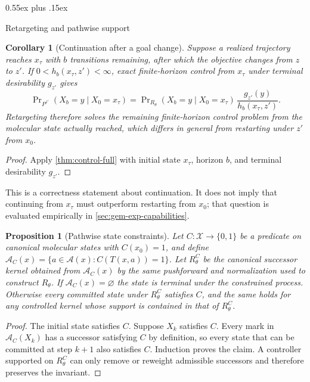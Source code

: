 \documentclass{article}
\makeatletter
\newtheorem{proposition}[theorem]{Proposition}
\newtheorem{corollary}[theorem]{Corollary}
\theoremstyle{definition}
\theoremstyle{remark}
\def\subsection{\@startsection{subsection}{2}{\z@}{-1.2ex plus -0.4ex minus -.2ex}%
  {0.55ex plus .15ex}{\normalsize\sc\raggedright}}
\newcommand{\X}{\mathcal{X}}
\newcommand{\A}{\mathcal{A}}
\makeatother
\begin{document}
\subsection{Retargeting and pathwise support}
\label{app:retarget-proof}

\begin{corollary}[Continuation after a goal change]
\label{cor:retarget-full}
Suppose a realized trajectory reaches $x_\tau$ with $b$ transitions remaining,
after which the objective changes from $z$ to $z'$. If
$0<h_b(x_\tau,z')<\infty$, exact finite-horizon control from $x_\tau$ under
terminal desirability $g_{z'}$ gives
\[
  \Pr\nolimits_{P^{z'}}(X_b=y\mid X_0=x_\tau)
  =\Pr\nolimits_{R_\theta}(X_b=y\mid X_0=x_\tau)\,\frac{g_{z'}(y)}{h_b(x_\tau,z')} .
\]
Retargeting therefore solves the remaining finite-horizon control problem from the
molecular state actually reached, which differs in general from restarting under
$z'$ from $x_0$.
\end{corollary}

\begin{proof}
Apply \cref{thm:control-full} with initial state $x_\tau$, horizon $b$, and
terminal desirability $g_{z'}$.
\end{proof}

This is a correctness statement about continuation. It does not imply that
continuing from $x_\tau$ must outperform restarting from $x_0$; that question is
evaluated empirically in \cref{sec:gem-exp-capabilities}.

\begin{proposition}[Pathwise state constraints]
\label{prop:pathwise-full}
Let $C:\X\to\{0,1\}$ be a predicate on canonical molecular states with
$C(x_0)=1$, and define
$\A_C(x)=\{a\in\A(x): C(T(x,a))=1\}$.
Let $R_\theta^{C}$ be the canonical successor kernel obtained from $\A_C(x)$ by
the same pushforward and normalization used to construct $R_\theta$. If
$\A_C(x)=\varnothing$ the state is terminal under the constrained process.
Otherwise every committed state under $R_\theta^{C}$ satisfies $C$, and the same
holds for any controlled kernel whose support is contained in that of
$R_\theta^{C}$.
\end{proposition}

\begin{proof}
The initial state satisfies $C$. Suppose $X_k$ satisfies $C$. Every mark in
$\A_C(X_k)$ has a successor satisfying $C$ by definition, so every state that can
be committed at step $k+1$ also satisfies $C$. Induction proves the claim. A
controller supported on $R_\theta^{C}$ can only remove or reweight admissible
successors and therefore preserves the invariant.
\end{proof}
\end{document}
